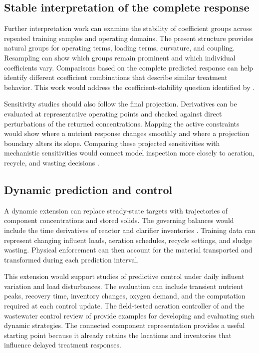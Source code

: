 \subsection{Stable interpretation of the complete response}

Further interpretation work can examine the stability of coefficient groups across repeated training samples and operating domains. The present structure provides natural groups for operating terms, loading terms, curvature, and coupling. Resampling can show which groups remain prominent and which individual coefficients vary. Comparisons based on the complete predicted response can help identify different coefficient combinations that describe similar treatment behavior. This work would address the coefficient-stability question identified by \citet{Selerio2026}.

Sensitivity studies should also follow the final projection. Derivatives can be evaluated at representative operating points and checked against direct perturbations of the returned concentrations. Mapping the active constraints would show where a nutrient response changes smoothly and where a projection boundary alters its slope. Comparing these projected sensitivities with mechanistic sensitivities would connect model inspection more closely to aeration, recycle, and wasting decisions \citep{Selerio2026,Shen2023}.

\subsection{Dynamic prediction and control}

A dynamic extension can replace steady-state targets with trajectories of component concentrations and stored solids. The governing balances would include the time derivatives of reactor and clarifier inventories \citep{Takacs1991,Alex2008}. Training data can represent changing influent loads, aeration schedules, recycle settings, and sludge wasting. Physical enforcement can then account for the material transported and transformed during each prediction interval.

This extension would support studies of predictive control under daily influent variation and load disturbances. The evaluation can include transient nutrient peaks, recovery time, inventory changes, oxygen demand, and the computation required at each control update. The field-tested aeration controller of \citet{Bernardelli2020} and the wastewater control review of \citet{Croll2023} provide examples for developing and evaluating such dynamic strategies. The connected component representation provides a useful starting point because it already retains the locations and inventories that influence delayed treatment responses.

